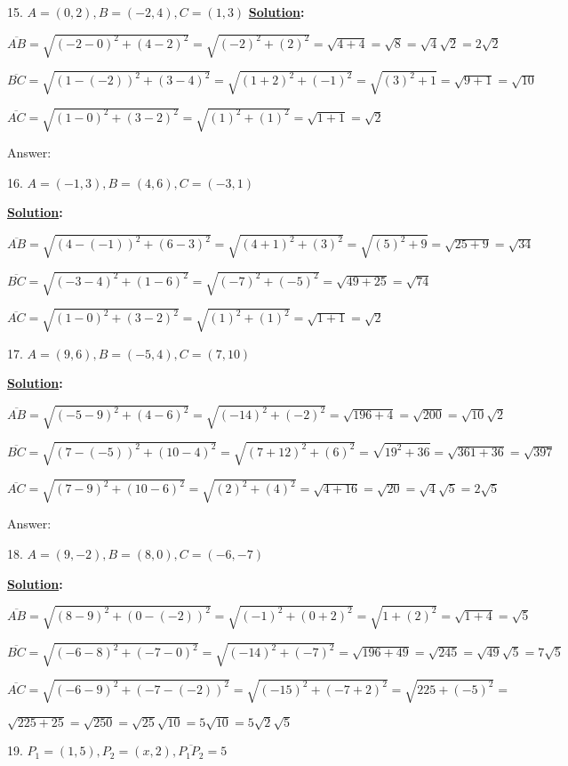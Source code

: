 \documentclass[10pt,letterpaper]{article}
\begin{document}
15. $A=(0, 2), B=(-2, 4), C=(1, 3)$
\textbf{\underline {Solution}:}

$\overline{AB} =\sqrt{(-2-0)^2+(4-2)^2}=\sqrt{(-2)^2+(2)^2}=\sqrt{4+4}=\sqrt{8}=\sqrt{4}\sqrt{2}=2\sqrt{2}$

$\overline{BC} =\sqrt{(1-(-2))^2+(3-4)^2}=\sqrt{(1+2)^2+(-1)^2}=\sqrt{(3)^2+1}=\sqrt{9+1}=\sqrt{10}$

$\overline{AC} =\sqrt{(1-0)^2+(3-2)^2}=\sqrt{(1)^2+(1)^2}=\sqrt{1+1}=\sqrt{2}$

\color{amethyst}Answer: \color{green}{Right Triangle}\color{black}

16. $A=(-1, 3), B=(4, 6), C=(-3, 1)$

\textbf{\underline {Solution}:}

$\overline{AB} =\sqrt{(4-(-1))^2+(6-3)^2}=\sqrt{(4+1)^2+(3)^2}=\sqrt{(5)^2+9}=\sqrt{25+9}=\sqrt{34}$

$\overline{BC} =\sqrt{(-3-4)^2+(1-6)^2}=\sqrt{(-7)^2+(-5)^2}=\sqrt{49+25}=\sqrt{74}$

$\overline{AC} =\sqrt{(1-0)^2+(3-2)^2}=\sqrt{(1)^2+(1)^2}=\sqrt{1+1}=\sqrt{2}$

17. $A=(9, 6), B=(-5, 4), C=(7, 10)$

\textbf{\underline {Solution}:}

$\overline{AB} =\sqrt{(-5-9)^2+(4-6)^2}=\sqrt{(-14)^2+(-2)^2}=\sqrt{196+4}=\sqrt{200}=\sqrt{10}\sqrt{2}$

$\overline{BC} =\sqrt{(7-(-5))^2+(10-4)^2}=\sqrt{(7+12)^2+(6)^2}=\sqrt{19^2+36}=\sqrt{361+36}=\sqrt{397}$

$\overline{AC} =\sqrt{(7-9)^2+(10-6)^2}=\sqrt{(2)^2+(4)^2}=\sqrt{4+16}=\sqrt{20}=\sqrt{4}\sqrt{5}=2\sqrt{5}$

\color{amethyst}Answer: \color{green}{Right Triangle}\color{black}

18. $A=(9, -2), B=(8, 0), C=(-6, -7)$

\textbf{\underline {Solution}:}

$\overline{AB} =\sqrt{(8-9)^2+(0-(-2))^2}=\sqrt{(-1)^2+(0+2)^2}=\sqrt{1+(2)^2}=\sqrt{1+4}=\sqrt{5}$

$\overline{BC} =\sqrt{(-6-8)^2+(-7-0)^2}=\sqrt{(-14)^2+(-7)^2}=\sqrt{196+49}=\sqrt{245}=\sqrt{49}\sqrt{5}=7\sqrt{5}$

$\overline{AC} =\sqrt{(-6-9)^2+(-7-(-2))^2}=\sqrt{(-15)^2+(-7+2)^2}=\sqrt{225+(-5)^2}=$

$\sqrt{225+25}=\sqrt{250}=\sqrt{25}\sqrt{10}=5\sqrt{10}=5\sqrt{2}\sqrt{5}$

19. $P_{1} = (1, 5), P_{2} = (x, 2), \overline{P_1P_2} = 5$
\end{document}
